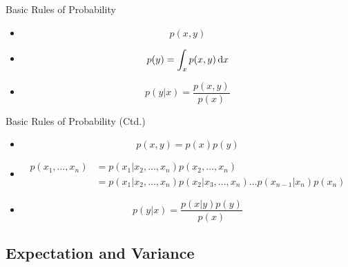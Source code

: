 \begin{frame}{Basic Rules of Probability}{}
	\begin{itemize}
		\item {}
		\begin{equation}
			p(x, y)
		\end{equation}
		\item {}
		\begin{equation}
			p(y) = \int_x p(x, y) \mathop{}\!\mathrm{d} x
		\end{equation}
		\item {}
		\begin{equation}
			p(y \vert x) = \frac{p(x, y)}{p(x)}
		\end{equation}
	\end{itemize}
\end{frame}


\begin{frame}{Basic Rules of Probability (Ctd.)}{}
	\begin{itemize}
		\item {}
		\begin{equation}
			p(x, y) = p(x) p(y)
		\end{equation}
		\item {}
		\begin{align}
			\nonumber
			p(x_1, \dots, x_n)
				&= p(x_1 \vert x_2, \dots, x_n) p(x_2, \dots, x_n) \\
				&= p(x_1 \vert x_2, \dots, x_n) p(x_2 \vert x_3, \dots, x_n) \dots p(x_{n-1} \vert x_n) p(x_n) 
		\end{align}
		\item {}
		\begin{equation}
			p(y \vert x) = \frac{p(x \vert y) p(y)}{p(x)}
		\end{equation}
	\end{itemize}
\end{frame}


\subsection{Expectation and Variance}

